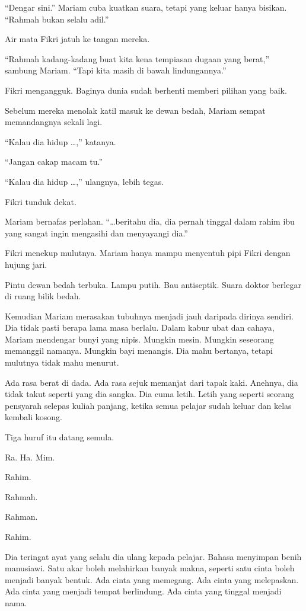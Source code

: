 \documentclass[
  11pt,
  a5paper,
  openany,
  oneside]{book}
\begin{document}
``Dengar sini.'' Mariam cuba kuatkan suara, tetapi yang keluar hanya
bisikan. ``Rahmah bukan selalu adil.''

Air mata Fikri jatuh ke tangan mereka.

``Rahmah kadang-kadang buat kita kena tempiasan dugaan yang berat,''
sambung Mariam. ``Tapi kita masih di bawah lindungannya.''

Fikri mengangguk. Baginya dunia sudah berhenti memberi pilihan yang
baik.

Sebelum mereka menolak katil masuk ke dewan bedah, Mariam sempat
memandangnya sekali lagi.

``Kalau dia hidup \ldots,'' katanya.

``Jangan cakap macam tu.''

``Kalau dia hidup \ldots,'' ulangnya, lebih tegas.

Fikri tunduk dekat.

Mariam bernafas perlahan. ``\ldots beritahu dia, dia pernah tinggal
dalam rahim ibu yang sangat ingin mengasihi dan menyayangi dia.''

Fikri menekup mulutnya. Mariam hanya mampu menyentuh pipi Fikri dengan
hujung jari.

Pintu dewan bedah terbuka. Lampu putih. Bau antiseptik. Suara doktor
berlegar di ruang bilik bedah.

Kemudian Mariam merasakan tubuhnya menjadi jauh daripada dirinya
sendiri. Dia tidak pasti berapa lama masa berlalu. Dalam kabur ubat dan
cahaya, Mariam mendengar bunyi yang nipis. Mungkin mesin. Mungkin
seseorang memanggil namanya. Mungkin bayi menangis. Dia mahu bertanya,
tetapi mulutnya tidak mahu menurut.

Ada rasa berat di dada. Ada rasa sejuk memanjat dari tapak kaki.
Anehnya, dia tidak takut seperti yang dia sangka. Dia cuma letih. Letih
yang seperti seorang pensyarah selepas kuliah panjang, ketika semua
pelajar sudah keluar dan kelas kembali kosong.

Tiga huruf itu datang semula.

Ra. Ha. Mim.

Rahim.

Rahmah.

Rahman.

Rahim.

Dia teringat ayat yang selalu dia ulang kepada pelajar. Bahasa menyimpan
benih manusiawi. Satu akar boleh melahirkan banyak makna, seperti satu
cinta boleh menjadi banyak bentuk. Ada cinta yang memegang. Ada cinta
yang melepaskan. Ada cinta yang menjadi tempat berlindung. Ada cinta
yang tinggal menjadi nama.
\end{document}
